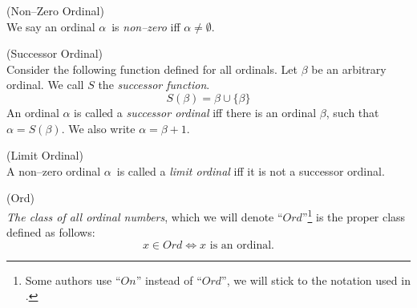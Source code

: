 \begin{definition}{(Non–Zero Ordinal)}\\ %
We say an ordinal $\alpha$ is \emph{non–zero} iff $\alpha \neq \emptyset$.
\end{definition}

\begin{definition}{(Successor Ordinal)}\label{def:successor_ordinal}\\ %
Consider the following function defined for all ordinals. Let $\beta$ be an arbitrary ordinal. We call $S$ the \emph{successor function}.
\begin{equation}
S(\beta) = \beta \cup \{\beta\}
\end{equation}
An ordinal $\alpha$ is called a \emph{successor ordinal} iff there is an ordinal $\beta$, such that $\alpha = S(\beta)$. We also write $\alpha = \beta+1$.
\end{definition}

\begin{definition}{(Limit Ordinal)}\label{def:limit_ordinal}\\ %
A non–zero ordinal $\alpha$ is called a \emph{limit ordinal} iff it is not a successor ordinal.
\end{definition}

\begin{definition}{(Ord)}\label{def:ord}\\  %
\emph{The class of all ordinal numbers}, which we will denote ``$Ord$''\footnote{Some authors use ``$On$'' instead of ``$Ord$'', we will stick to the notation used in \cite{JechBook}.} is the proper class defined as follows:
\begin{equation}
x \in Ord \iff x\mbox{ is an ordinal}\mbox{.}
\end{equation}
\end{definition}


